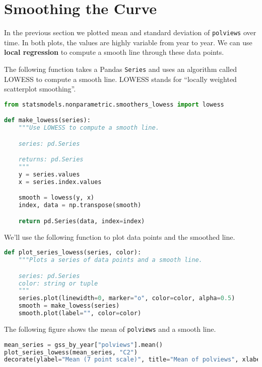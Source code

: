 \hypertarget{smoothing-the-curve}{%
\section{Smoothing the Curve}\label{smoothing-the-curve}}

In the previous section we plotted mean and standard deviation of
\passthrough{\lstinline!polviews!} over time. In both plots, the values
are highly variable from year to year. We can use \textbf{local
regression} to compute a smooth line through these data points.

The following function takes a Pandas \passthrough{\lstinline!Series!}
and uses an algorithm called LOWESS to compute a smooth line. LOWESS
stands for ``locally weighted scatterplot smoothing''.

\begin{lstlisting}[language=Python,style=source]
from statsmodels.nonparametric.smoothers_lowess import lowess

def make_lowess(series):
    """Use LOWESS to compute a smooth line.

    series: pd.Series

    returns: pd.Series
    """
    y = series.values
    x = series.index.values

    smooth = lowess(y, x)
    index, data = np.transpose(smooth)

    return pd.Series(data, index=index)
\end{lstlisting}

We'll use the following function to plot data points and the smoothed
line.

\begin{lstlisting}[language=Python,style=source]
def plot_series_lowess(series, color):
    """Plots a series of data points and a smooth line.

    series: pd.Series
    color: string or tuple
    """
    series.plot(linewidth=0, marker="o", color=color, alpha=0.5)
    smooth = make_lowess(series)
    smooth.plot(label="", color=color)
\end{lstlisting}

The following figure shows the mean of
\passthrough{\lstinline!polviews!} and a smooth line.

\begin{lstlisting}[language=Python,style=source]
mean_series = gss_by_year["polviews"].mean()
plot_series_lowess(mean_series, "C2")
decorate(ylabel="Mean (7 point scale)", title="Mean of polviews", xlabel="Year")
\end{lstlisting}

